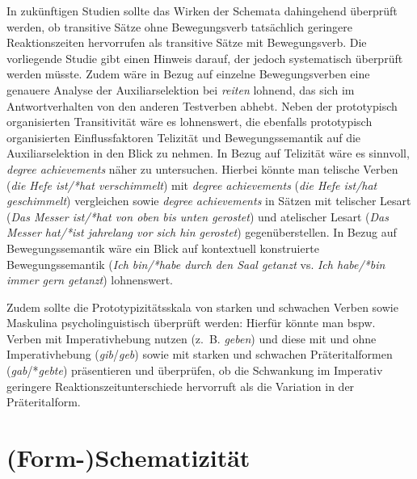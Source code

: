 In zukünftigen Studien sollte das Wirken der Schemata dahingehend überprüft werden, ob transitive Sätze ohne Bewegungsverb tatsächlich geringere Reaktionszeiten hervorrufen als transitive Sätze mit Bewegungsverb. Die vorliegende Studie gibt einen Hinweis darauf, der jedoch systematisch überprüft werden müsste. Zudem wäre in Bezug auf einzelne Bewegungsverben eine genauere Analyse der Auxiliarselektion bei \textit{reiten} lohnend, das sich im Antwortverhalten von den anderen Testverben abhebt. Neben der prototypisch organisierten Transitivität wäre es lohnenswert, die ebenfalls prototypisch organisierten Einflussfaktoren Telizität und Bewegungssemantik auf die Auxiliarselektion in den Blick zu nehmen. In Bezug auf Telizität wäre es sinnvoll, \textit{degree achievements} näher zu untersuchen. Hierbei könnte man telische Verben (\textit{die Hefe ist/*hat verschimmelt}) mit \textit{degree achievements} (\textit{die Hefe ist/hat geschimmelt}) vergleichen sowie \textit{degree achievements} in Sätzen mit telischer Lesart (\textit{Das Messer ist/*hat von oben bis unten gerostet}) und atelischer Lesart (\textit{Das Messer hat/*ist jahrelang vor sich hin gerostet}) gegenüberstellen. In Bezug auf Bewegungssemantik wäre ein Blick auf kontextuell konstruierte Bewegungssemantik (\textit{Ich bin/*habe durch den Saal getanzt} vs. \textit{Ich habe/*bin immer gern getanzt}) lohnenswert.  

\begin{sloppypar}
Zudem sollte die Prototypizitätsskala von starken und schwachen Verben sowie Maskulina psycholinguistisch überprüft werden: Hierfür könnte man bspw. Verben mit Imperativhebung nutzen (z.~B. \textit{geben}) und diese mit und ohne Imperativhebung (\textit{gib}\slash\textit{geb}) sowie mit starken und schwachen Präteritalformen (\textit{gab}/*\textit{geb\-te}) präsentieren und überprüfen, ob die Schwankung im Imperativ geringere Reaktionszeitunterschiede hervorruft als die Variation in der Präteritalform.
\end{sloppypar}

\section{(Form-)Schematizität}

